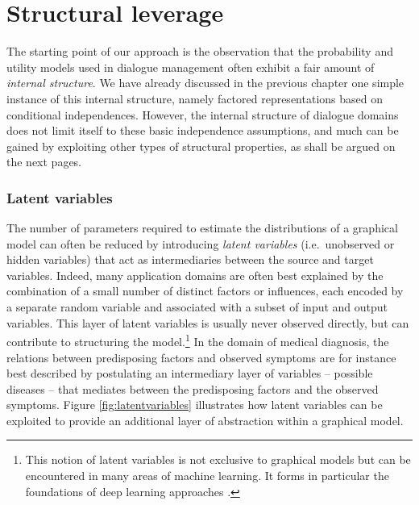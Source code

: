 \section{Structural leverage}
\label{sec:rmotivation}

The starting point of our approach is the observation that the probability and utility models used in dialogue management often exhibit a fair amount of \textit{internal structure}.  
We have already discussed in the previous chapter one simple instance of this internal structure, namely factored representations based on conditional independences. However, the internal structure of dialogue domains does not limit itself to these basic independence assumptions, and much can be gained by exploiting other types of structural properties, as shall be argued on the next pages. 



\subsubsection*{Latent variables}
The number of parameters required to estimate the distributions of a graphical model can often be reduced by introducing \textit{latent variables} (i.e.\ unobserved or hidden variables) that act as intermediaries between the source and target variables. Indeed, many application domains are often best explained by the combination of a small number of distinct factors or influences, each encoded by a separate random variable and associated with a subset of input and output variables. This layer of latent variables is usually never observed directly, but can contribute to structuring the model.\footnote{This notion of latent variables is not exclusive to graphical models but can be encountered in many areas of machine learning. It forms in particular the foundations of deep learning approaches \citep{Bengio:2009}.} In the domain of medical diagnosis, the relations between predisposing factors and observed symptoms are for instance best described by postulating an intermediary layer of variables -- possible diseases -- that mediates between the predisposing factors and the observed symptoms.  Figure \ref{fig:latentvariables} illustrates how latent variables can be exploited to provide an additional layer of abstraction within a graphical model.

